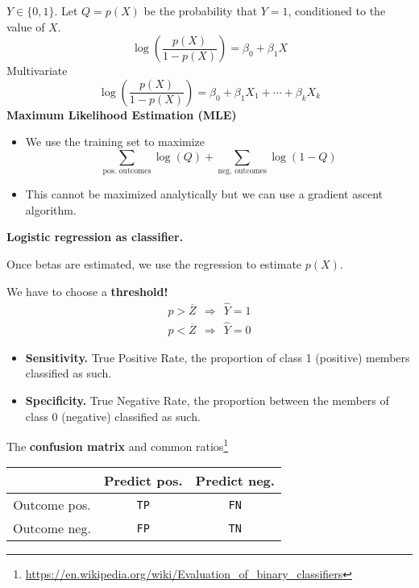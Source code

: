 
$Y\in \{0,1\}$. Let $Q=p\left(X\right)$ be the probability that $Y=1$, conditioned to the value of $X$.
\begin{equation*}
    \log\left(\frac{p\left(X\right)}{1-p\left(X\right)}\right) =\beta _{0} +\beta _{1} X
\end{equation*}
Multivariate
\begin{equation*}
    \log\left(\frac{p(X)}{1-p(X)}\right) =\beta _{0} +\beta _{1} X_{1} +\cdots +\beta _{k} X_{k}
\end{equation*}
\textbf{Maximum Likelihood Estimation (MLE)}
\begin{itemize}
    \item We use the training set to maximize
          \begin{equation*}
              \sum _{\text{pos. outcomes}}\log(Q) +\sum _{\text{neg. outcomes}}\log(1-Q)
          \end{equation*}
    \item This cannot be maximized analytically but we can use a gradient ascent algorithm.
\end{itemize}

\textbf{Logistic regression as classifier.}

Once betas are estimated, we use the regression to estimate $p\left(X\right)$.

We have to choose a \textbf{threshold!}
\begin{gather*}
    p >\overline{Z} \ \ \Longrightarrow \ \ \hat{Y} =1\\
    p< \overline{Z} \ \ \Longrightarrow \ \ \hat{Y} =0
\end{gather*}

\begin{itemize}
    \item \textbf{Sensitivity.} True Positive Rate, the proportion of class 1 (positive) members classified as such.
    \item \textbf{Specificity.} True Negative Rate, the proportion between the members of class 0 (negative) classified as such.
\end{itemize}

The \textbf{confusion matrix} and common ratios\footnote{\url{https://en.wikipedia.org/wiki/Evaluation_of_binary_classifiers}}

\begin{center}
    \begin{tabular}{|c|c|c|}
        \hline 
                     & Predict pos. & Predict neg. \\
        \hline 
        Outcome pos. & \texttt{TP}         & \texttt{FN}         \\
        \hline 
        Outcome neg. & \texttt{FP}         & \texttt{TN}         \\
        \hline
    \end{tabular}
\end{center}

